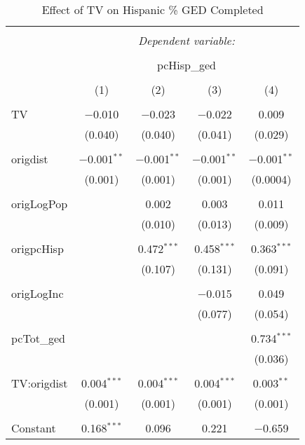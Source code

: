 
\begin{table}[!htbp] \centering 
  \caption{Effect of TV on Hispanic \% GED Completed} 
  \label{} 
\begin{tabular}{@{\extracolsep{5pt}}lcccc} 
\\[-1.8ex]\hline 
\hline \\[-1.8ex] 
 & \multicolumn{4}{c}{\textit{Dependent variable:}} \\ 
\cline{2-5} 
\\[-1.8ex] & \multicolumn{4}{c}{pcHisp\_ged} \\ 
\\[-1.8ex] & (1) & (2) & (3) & (4)\\ 
\hline \\[-1.8ex] 
 TV & $-$0.010 & $-$0.023 & $-$0.022 & 0.009 \\ 
  & (0.040) & (0.040) & (0.041) & (0.029) \\ 
  & & & & \\ 
 origdist & $-$0.001$^{**}$ & $-$0.001$^{**}$ & $-$0.001$^{**}$ & $-$0.001$^{**}$ \\ 
  & (0.001) & (0.001) & (0.001) & (0.0004) \\ 
  & & & & \\ 
 origLogPop &  & 0.002 & 0.003 & 0.011 \\ 
  &  & (0.010) & (0.013) & (0.009) \\ 
  & & & & \\ 
 origpcHisp &  & 0.472$^{***}$ & 0.458$^{***}$ & 0.363$^{***}$ \\ 
  &  & (0.107) & (0.131) & (0.091) \\ 
  & & & & \\ 
 origLogInc &  &  & $-$0.015 & 0.049 \\ 
  &  &  & (0.077) & (0.054) \\ 
  & & & & \\ 
 pcTot\_ged &  &  &  & 0.734$^{***}$ \\ 
  &  &  &  & (0.036) \\ 
  & & & & \\ 
 TV:origdist & 0.004$^{***}$ & 0.004$^{***}$ & 0.004$^{***}$ & 0.003$^{**}$ \\ 
  & (0.001) & (0.001) & (0.001) & (0.001) \\ 
  & & & & \\ 
 Constant & 0.168$^{***}$ & 0.096 & 0.221 & $-$0.659 \\ 

\end{tabular}
\end{table}
